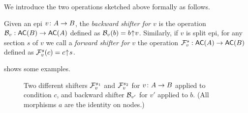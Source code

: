 
We introduce the two operations sketched above formally as follows.

\begin{definition}\label{def:ab-shifter}
Given an epi $v\colon A\rightarrow B$, the \emph{backward shifter for $v$} is the operation $\cB_v: \AC{B} \to \AC{A}$  defined as $\mathcal{B}_v(b) = {b}{\mskip1mu\uparrow\mskip1mu}{v}$.
Similarly, if $v$ is split epi, for any section $s$ of $v$ we call a \emph{forward shifter for $v$} the operation $\cF^s_v: \AC{A} \to \AC{B}$ defined as $\mathcal{F}^s_v(c) = {c}{\mskip1mu\uparrow\mskip1mu}{s}$.
\end{definition}
 shows some examples.


\begin{figure}
\centering

\caption{Two different shifters $\mathcal{F}_v^{s_1}$ and $\mathcal{F}_v^{s_2}$ for $v \colon A \rightarrow B$ applied to condition $c$, and backward shifter $\mathcal{B}_{v'}$ for $v'$ applied to $b$. (All morphisms $a$ are the identity on nodes.)}
\end{figure}


